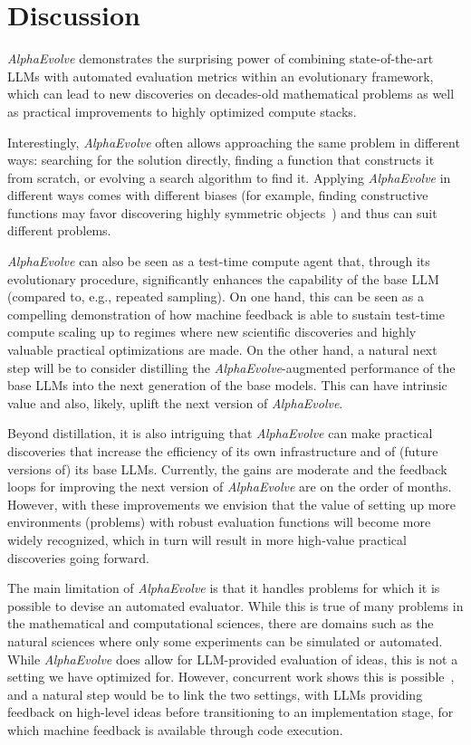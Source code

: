 \documentclass[logo,copyright,12pt]{googledeepmind}
\theoremstyle{definition}
\theoremstyle{remark}
\theoremstyle{plain}
\newcommand{\method}{\emph{AlphaEvolve}\xspace}
\begin{document}
\section{Discussion}
\label{sec:discussion}

\method demonstrates the surprising power of combining state-of-the-art LLMs with automated evaluation metrics within an evolutionary framework, which can lead to new discoveries on decades-old mathematical problems as well as practical improvements to highly optimized compute stacks.

Interestingly, \method often allows approaching the same problem in different ways: searching for the solution directly, finding a function that constructs it from scratch, or evolving a search algorithm to find it.
Applying \method in different ways  comes with different biases (for example, finding constructive functions may favor discovering highly symmetric objects~\cite{paredes2023mathematical}) and thus can suit different problems.

\method can also be seen as a test-time compute agent that, through its evolutionary procedure, significantly enhances the capability of the base LLM (compared to, e.g., repeated sampling).
On one hand, this can be seen as a compelling demonstration of how machine feedback is able to sustain test-time compute scaling up to regimes where new scientific discoveries and highly valuable practical optimizations are made.
On the other hand, a natural next step will be to consider distilling the \method-augmented performance of the base LLMs into the next generation of the base models.
This can have intrinsic value and also, likely, uplift the next version of \method.

Beyond distillation, it is also intriguing that \method can make practical discoveries that increase the efficiency of its own infrastructure and of (future versions of) its base LLMs.
Currently, the gains are moderate and the feedback loops for improving the next version of \method are on the order of months.
However, with these improvements we envision that the value of setting up more environments (problems) with robust evaluation functions will become more widely recognized, which in turn will result in more high-value practical discoveries going forward.

The main limitation of \method is that it handles problems for which it is possible to devise an automated evaluator.
While this is true of many problems in the mathematical and computational sciences, there are domains such as the natural sciences where only some experiments can be simulated or automated.
While \method does allow for LLM-provided evaluation of ideas, this is not a setting we have optimized for.
However, concurrent work shows this is possible~\cite{gottweis2025towards}, and a natural step would be to link the two settings, with LLMs providing feedback on high-level ideas before transitioning to an implementation stage, for which machine feedback is available through code execution.
\end{document}
